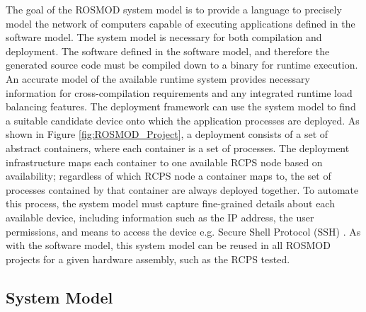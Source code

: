 The goal of the ROSMOD system model is to provide a language to precisely model the network of computers capable of executing applications defined in the software model. The system model is necessary for both compilation and deployment. The software defined in the software model, and therefore the generated source code must be compiled down to a binary for runtime execution. An accurate model of the available runtime system provides necessary information for cross-compilation requirements and any integrated runtime load balancing features. The deployment framework can use the system model to find a suitable candidate device onto which the application processes are deployed. As shown in Figure \ref{fig:ROSMOD_Project}, a deployment consists of a set of abstract containers, where each container is a set of processes. The deployment infrastructure maps each container to one available RCPS node based on availability; regardless of which RCPS node a container maps to, the set of processes contained by that container are always deployed together. To automate this process, the system model must capture fine-grained details about each available device, including information such as the IP address, the user permissions, and means to access the device e.g. Secure Shell Protocol (SSH) \cite{ylonen2006secure}. As with the software model, this system model can be reused in all ROSMOD projects for a given hardware assembly, such as the RCPS tested. 

\subsection{System Model} 

